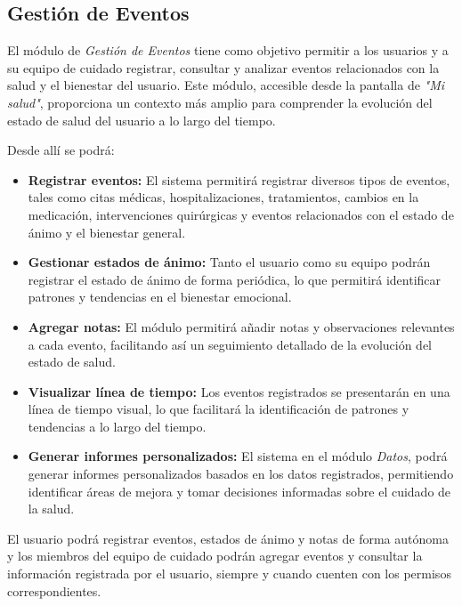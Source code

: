 \documentclass[a4paper,12pt]{article}
\begin{document}
    \subsection{Gestión de Eventos}
    \par El módulo de \textit{Gestión de Eventos} tiene como objetivo permitir a los usuarios y a su equipo de cuidado registrar, consultar y analizar eventos relacionados con la salud y el bienestar del usuario. Este módulo, accesible desde la pantalla de \textit{"Mi salud"}, proporciona un contexto más amplio para comprender la evolución del estado de salud del usuario a lo largo del tiempo.
    \par Desde allí se podrá:
    \begin{itemize}
        \item \textbf{Registrar eventos:} El sistema permitirá registrar diversos tipos de eventos, tales como citas médicas, hospitalizaciones, tratamientos, cambios en la medicación, intervenciones quirúrgicas y eventos relacionados con el estado de ánimo y el bienestar general.
        \item \textbf{Gestionar estados de ánimo:} Tanto el usuario como su equipo podrán registrar el estado de ánimo de forma periódica, lo que permitirá identificar patrones y tendencias en el bienestar emocional.
        \item \textbf{Agregar notas:} El módulo permitirá añadir notas y observaciones relevantes a cada evento, facilitando así un seguimiento detallado de la evolución del estado de salud.
        \item \textbf{Visualizar línea de tiempo:}  Los eventos registrados se presentarán en una línea de tiempo visual, lo que facilitará la identificación de patrones y tendencias a lo largo del tiempo.
        \item \textbf{Generar informes personalizados:} El sistema en el módulo \textit{Datos}, podrá generar informes personalizados basados en los datos registrados, permitiendo identificar áreas de mejora y tomar decisiones informadas sobre el cuidado de la salud.
    \end{itemize}
    \par El usuario podrá registrar eventos, estados de ánimo y notas de forma autónoma y los miembros del equipo de cuidado podrán agregar eventos y consultar la información registrada por el usuario, siempre y cuando cuenten con los permisos correspondientes.

    \newpage

\end{document}
